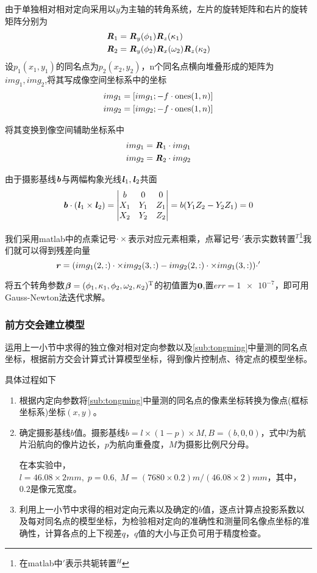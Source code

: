 由于单独相对相对定向采用以$y$为主轴的转角系统，左片的旋转矩阵和右片的旋转矩阵分别为
\begin{align}
\boldsymbol{\mathit{R}}_1 &=\boldsymbol{\mathit{R}}_y(\phi_1)\boldsymbol{\mathit{R}}_z(\kappa_1) \\
\boldsymbol{\mathit{R}}_2 &=\boldsymbol{\mathit{R}}_y(\phi_2)\boldsymbol{\mathit{R}}_x(\omega_2)\boldsymbol{\mathit{R}}_z(\kappa_2)
\end{align}
设$p_1(x_1,y_1)$的同名点为$p_2(x_2,y_2)$，n个同名点横向堆叠形成的矩阵为$img_1,img_2$,将其写成像空间坐标系中的坐标
\begin{align}
img_1=[img_1;-f\cdot \mathrm{ones}(1,n)]\\
img_2=[img_2;-f\cdot \mathrm{ones}(1,n)]
\end{align}

将其变换到像空间辅助坐标系中
\begin{align}
img_1=\boldsymbol{\mathit{R}}_1\cdot img_1\\
img_2=\boldsymbol{\mathit{R}}_2\cdot img_2\label{eq:img2}
\end{align}

由于摄影基线$\boldsymbol{\mathit{b}}$与两幅构象光线$\boldsymbol{\mathit{l}}_1,\boldsymbol{\mathit{l}}_2$共面
\begin{equation}
\boldsymbol{\mathit{b}}\cdot(\boldsymbol{\mathit{l}}_1\times\boldsymbol{\mathit{l}}_2)=
\begin{vmatrix}
b & 0 & 0 \\
X_1 & Y_1 & Z_1 \\
X_2 & Y_2 & Z_2
\end{vmatrix}=b(Y_1Z_2-Y_2Z_1)=0
\end{equation}

我们采用matlab中的点乘记号$\cdot\times$表示对应元素相乘，点幂记号$\cdot '$表示实数转置$^T$\footnote{在matlab中$'$表示共轭转置$^H$}我们就可以得到残差向量
\begin{equation}
\boldsymbol{\mathit{r}}=(img_1(2,:)\cdot\times img_2(3,:)-img_2(2,:)\cdot\times img_1(3,:))\cdot '
\end{equation}

将五个转角参数$\boldsymbol{\beta}=(\phi_1,\kappa_1,\phi_2,\omega_2,\kappa_2)^\mathrm{T}$的初值置为$\boldsymbol{0}$,置$err=\num{1e-7}$，即可用Gauss-Newton法迭代求解。

\subsubsection{前方交会建立模型}

运用上一小节中求得的独立像对相对定向参数以及\ref{sub:tongming}中量测的同名点坐标，根据前方交会计算式计算模型坐标，得到像片控制点、待定点的模型坐标。

具体过程如下
\begin{enumerate}
\item 根据内定向参数将\ref{sub:tongming}中量测的同名点的像素坐标转换为像点(框标坐标系)坐标$(x,y)$。
\item 确定摄影基线$b$值。摄影基线$b=l\times(1-p)\times M,B=(b,0,0)$，式中$l$为航片沿航向的像片边长，$p$为航向重叠度，$M$为摄影比例尺分母。

在本实验中，$l=46.08\times 2\si{mm},\; p=0.6,\; M=(7680\times 0.2)\si{m}/(46.08\times 2)\si{mm}$，其中，$0.2$是像元宽度。
\item 利用上一小节中求得的相对定向元素以及确定的$b$值，逐点计算点投影系数以及每对同名点的模型坐标，为检验相对定向的准确性和测量同名像点坐标的准确性，计算各点的上下视差$q$，$q$值的大小与正负可用于精度检查。
\end{enumerate}

